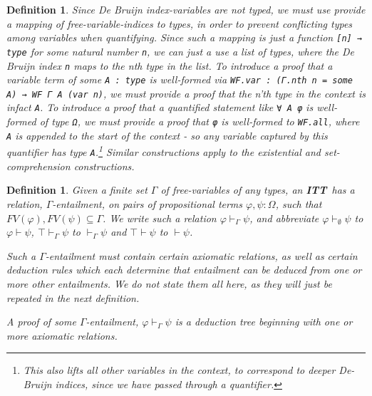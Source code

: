 \documentclass[12pt,leqno]{article}
\def\lc{\lstinline}
\newcommand{\ITT}{\textbf{ITT}}
\theoremstyle{example}
\newtheorem{definition}[theorem]{Definition}
\numberwithin{equation}{section}
\begin{document}
\begin{definition}
  Since De Bruijn index-variables are not typed, we must use provide a mapping of free-variable-indices to types, in order to prevent conflicting types among variables when quantifying. Since such a mapping is just a function \lc{[n] → type} for some natural number \lc{n}, we can just a use a list of types, where the De Bruijn index \lc{n} maps to the nth type in the list. To introduce a proof that a variable term of some \lc{A : type} is well-formed via \lc{WF.var : (Γ.nth n = some A) → WF Γ A (var n)}, we must provide a proof that the n'th type in the context is infact \lc{A}. To introduce a proof that a quantified statement like \lc{∀ A φ} is well-formed of type \lc{Ω}, we must provide a proof that \lc{φ} is well-formed to \lc{WF.all}, where \lc{A} is appended to the start of the context - so any variable captured by this quantifier has type \lc{A}.\footnote{This also lifts all other variables in the context, to correspond to deeper De-Bruijn indices, since we have passed through a quantifier.} Similar constructions apply to the existential and set-comprehension constructions.
\end{definition}

\begin{definition}
  Given a finite set $\Gamma$ of free-variables of any types, an \ITT~has a relation, $\Gamma$-entailment, on pairs of propositional terms $\varphi, \psi : \Omega$, such that $FV(\varphi), FV(\psi) \subseteq \Gamma$. We write such a relation $\varphi \vdash_\Gamma \psi$, and abbreviate $\varphi \vdash_\emptyset \psi$ to $\varphi \vdash \psi$, $\top \vdash_\Gamma \psi$ to $\vdash_\Gamma \psi$ and $\top \vdash \psi$ to $\vdash \psi$.

  Such a $\Gamma$-entailment must contain certain axiomatic relations, as well as certain deduction rules which each determine that entailment can be deduced from one or more other entailments. We do not state them all here, as they will just be repeated in the next definition.

  A \emph{proof} of some $\Gamma$-entailment, $\varphi \vdash_\Gamma \psi$ is a deduction tree beginning with one or more axiomatic relations.
\end{definition}
  
\end{document}
